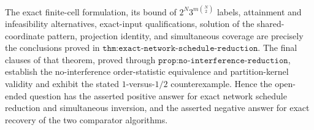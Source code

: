 The exact finite-cell formulation, its bound of \(2^N3^{m\binom N2}\) labels, attainment and infeasibility alternatives, exact-input qualifications, solution of the shared-coordinate pattern, projection identity, and simultaneous coverage are precisely the conclusions proved in \(\texttt{thm:exact-network-schedule-reduction}\).  The final clauses of that theorem, proved through \(\texttt{prop:no-interference-reduction}\), establish the no-interference order-statistic equivalence and partition-kernel validity and exhibit the stated \(1\)-versus-\(1/2\) counterexample.  Hence the open-ended question has the asserted positive answer for exact network schedule reduction and simultaneous inversion, and the asserted negative answer for exact recovery of the two comparator algorithms.
